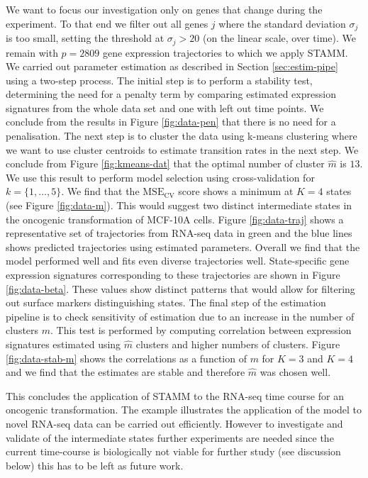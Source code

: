 We want to focus our investigation only on genes that change during the experiment. To that end we filter out all genes $j$ where the standard deviation $\sigma_j$ is too small, setting the threshold at $\sigma_j > 20$ (on the linear scale, over time). We remain with $p=2809$ gene expression trajectories to which we apply STAMM. We carried out parameter estimation as described in Section \ref{sec:estim-pipe} using a two-step process. The initial step is to perform a stability test, determining the need for a penalty term by comparing estimated expression signatures from the whole data set and one with left out time points. We conclude from the results in Figure \ref{fig:data-pen} that there is no need for a penalisation. The next step is to cluster the data using k-means clustering where we want to use cluster centroids to estimate transition rates in the next step. We conclude from Figure \ref{fig:kmeans-dat} that the optimal number of cluster  $\hat{m}$ is $13$. We use this result to perform model selection using cross-validation for $k=\lbrace 1, \ldots, 5\rbrace$. We find that the $\mathrm{MSE_{CV}}$ score shows a minimum at $K=4$ states (see Figure \ref{fig:data-m}). This would suggest two distinct intermediate states in the oncogenic transformation of MCF-10A cells. Figure \ref{fig:data-traj} shows a representative set of trajectories from RNA-seq data in green and the blue lines shows predicted trajectories using estimated parameters. Overall we find that the model performed well and fits even diverse trajectories well. State-specific gene expression signatures corresponding to these trajectories are shown in Figure \ref{fig:data-beta}. These values show distinct patterns that would allow for filtering out surface markers distinguishing states. The final step of the estimation pipeline is to check sensitivity of estimation due to an increase in the number of clusters $m$. This test is performed by computing correlation between expression signatures estimated using $\hat{m}$ clusters and higher numbers of clusters. Figure \ref{fig:data-stab-m} shows the correlations as a function of $m$ for $K=3$ and $K=4$ and we find that the estimates are stable and therefore $\hat{m}$ was chosen well.

This concludes the application of STAMM to the RNA-seq time course for an oncogenic transformation. The example illustrates the application of the model to novel RNA-seq data can be carried out efficiently. However to investigate and validate of the intermediate states further experiments are needed since the current time-course is biologically not viable for further study (see discussion below) this has to be left as future work.

